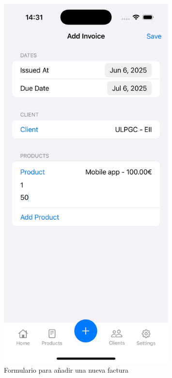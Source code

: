 \begin{large}
\begin{figure}[H]
	\centering
  \begin{minipage}[t]{0.45\textwidth}
    \centering
    \includegraphics[width=0.8\textwidth]{Ilustraciones/ios_addinvoice.png}
    \caption{Formulario para añadir una nueva factura}
    \label{fig:add_invoice}
  \end{minipage}\hfill
  \begin{minipage}[t]{0.45\textwidth}
    \centering

\end{minipage}
\end{figure}
\end{large}
